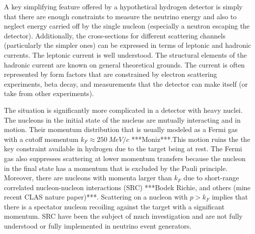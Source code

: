 A key simplifying feature offered by a hypothetical hydrogen detector is simply that there are enough constraints to measure the neutrino energy and also to neglect energy carried off by the single nucleon (especially a neutron escaping the detector). Additionally, the cross-sections for different scattering channels (particularly the simpler ones) can be expressed in terms of leptonic and hadronic currents. The leptonic current is well understood. The structural elements of the hadronic current are known on general theoretical grounds. The current is often represented by form factors that are constrained by electron scattering experiments, beta decay, and measurements that the detector can make itself (or take from other experiments). 




The situation is significantly more complicated in a detector with heavy nuclei. The nucleons in the initial state of the nucleus are mutually interacting and in motion. Their momentum distribution that is usually modeled as a Fermi gas with a cutoff momentum $k_F \approx %
\SI{250}{MeV/c}$ ***Moniz***.This motion ruins the the key constraint available in hydrogen due to the target being at rest. The Fermi gas also suppresses scattering at lower momentum transfers because the nucleon in the final state has a momentum that is excluded by the Pauli principle.  Moreover, there are nucleons with momenta larger than $k_F$ due to short-range correlated nucleon-nucleon interactions (SRC) ***Bodek Richie, and others (mine recent CLAS nature paper)***. Scattering on a nucleon with $p>k_F$ implies that there is a spectator nucleon recoiling against the target with a significant momentum. SRC have been the subject of much investigation and are not fully understood or fully implemented in neutrino event generators.


